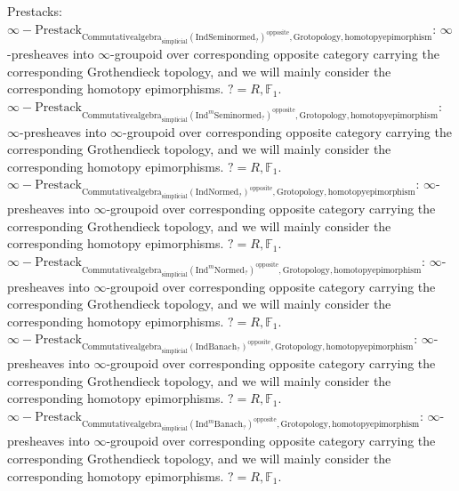 \documentclass[11pt]{book}
\theoremstyle{definition}
\numberwithin{equation}{section}
\begin{document}
\noindent Prestacks:\\
 
 
\noindent $\infty-\mathrm{Prestack}_{\mathrm{Commutativealgebra}_{\mathrm{simplicial}}(\mathrm{Ind}\mathrm{Seminormed}_?)^\mathrm{opposite},\mathrm{Grotopology,homotopyepimorphism}}$: $\infty$-presheaves into $\infty$-groupoid over corresponding opposite category carrying the corresponding Grothendieck topology, and we will mainly consider the corresponding homotopy epimorphisms. $?=R,\mathbb{F}_1$.\\
\noindent $\infty-\mathrm{Prestack}_{\mathrm{Commutativealgebra}_{\mathrm{simplicial}}(\mathrm{Ind}^m\mathrm{Seminormed}_?)^\mathrm{opposite},\mathrm{Grotopology,homotopyepimorphism}}$: $\infty$-presheaves into $\infty$-groupoid over corresponding opposite category carrying the corresponding Grothendieck topology, and we will mainly consider the corresponding homotopy epimorphisms. $?=R,\mathbb{F}_1$.\\
\noindent $\infty-\mathrm{Prestack}_{\mathrm{Commutativealgebra}_{\mathrm{simplicial}}(\mathrm{Ind}\mathrm{Normed}_?)^\mathrm{opposite},\mathrm{Grotopology,homotopyepimorphism}}$: $\infty$-presheaves into $\infty$-groupoid over corresponding opposite category carrying the corresponding Grothendieck topology, and we will mainly consider the corresponding homotopy epimorphisms. $?=R,\mathbb{F}_1$.\\
\noindent $\infty-\mathrm{Prestack}_{\mathrm{Commutativealgebra}_{\mathrm{simplicial}}(\mathrm{Ind}^m\mathrm{Normed}_?)^\mathrm{opposite},\mathrm{Grotopology,homotopyepimorphism}}$: $\infty$-presheaves into $\infty$-groupoid over corresponding opposite category carrying the corresponding Grothendieck topology, and we will mainly consider the corresponding homotopy epimorphisms. $?=R,\mathbb{F}_1$.\\
\noindent $\infty-\mathrm{Prestack}_{\mathrm{Commutativealgebra}_{\mathrm{simplicial}}(\mathrm{Ind}\mathrm{Banach}_?)^\mathrm{opposite},\mathrm{Grotopology,homotopyepimorphism}}$: $\infty$-presheaves into $\infty$-groupoid over corresponding opposite category carrying the corresponding Grothendieck topology, and we will mainly consider the corresponding homotopy epimorphisms. $?=R,\mathbb{F}_1$.\\
\noindent $\infty-\mathrm{Prestack}_{\mathrm{Commutativealgebra}_{\mathrm{simplicial}}(\mathrm{Ind}^m\mathrm{Banach}_?)^\mathrm{opposite},\mathrm{Grotopology,homotopyepimorphism}}$: $\infty$-presheaves into $\infty$-groupoid over corresponding opposite category carrying the corresponding Grothendieck topology, and we will mainly consider the corresponding homotopy epimorphisms. $?=R,\mathbb{F}_1$.\\
 
\end{document}

